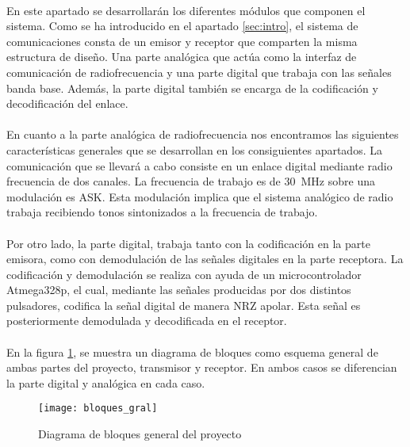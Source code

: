 \paragraph{}
En este apartado se desarrollar\'an los diferentes módulos que componen el sistema.
Como se ha introducido en el apartado \ref{sec:intro}, el sistema de comunicaciones consta de un emisor y receptor que comparten la misma estructura de diseño. 
Una parte analógica que actúa como la interfaz de comunicación de radiofrecuencia y una parte digital que trabaja con las señales banda base. Además, la parte digital también se encarga de la codificación y decodificación del enlace.
\paragraph{}
En cuanto a la parte analógica de radiofrecuencia nos encontramos las siguientes características generales que se desarrollan en los consiguientes apartados. 
La comunicaci\'on que se llevará a cabo consiste en un enlace digital mediante radio frecuencia de dos canales.
La frecuencia de trabajo es de \SI{30}{\mega\hertz} sobre una modulación es ASK.
Esta modulación implica que el sistema analógico de radio trabaja recibiendo tonos sintonizados a la frecuencia de trabajo.
\paragraph{}
Por otro lado, la parte digital, trabaja tanto con
la codificación en la parte emisora, como con demodulación de las señales digitales en la parte receptora. 
La codificación y demodulación se realiza con ayuda de un microcontrolador Atmega328p, el cual, mediante las señales producidas por dos distintos pulsadores, codifica la señal digital de manera NRZ apolar.
Esta señal es posteriormente demodulada y decodificada en el receptor.
\paragraph{}
En la figura \ref{fig:bloques_gral}, se muestra un diagrama de bloques como esquema general de ambas partes del proyecto, transmisor y receptor. En ambos casos se diferencian la parte digital y anal\'ogica en cada caso.

\begin{figure}[h]
    \centering
    \texttt{[image: bloques\_gral]}
    \caption{Diagrama de bloques general del proyecto}
    \label{fig:bloques_gral}
\end{figure}
